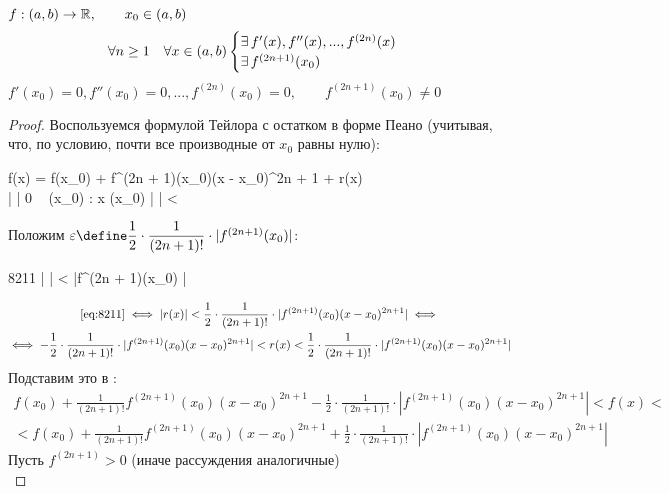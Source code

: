 \begin{theorem}
	\hfill \\
	$ f : (a, b) \to \mathbb{R}, \qquad x_0 \in (a, b) $
	$$ \forall n \ge 1 \quad \forall x \in (a, b)
	\begin{cases}
		\exists\, f'(x), f''(x), ..., f^{(2n)}(x) \\
		\exists\, f^{(2n + 1)}(x_0)
	\end{cases} $$
	$ f'(x_0) = 0, f''(x_0) = 0, ..., f^{(2n)}(x_0) = 0, \qquad f^{(2n + 1)}(x_0) \ne 0 $
\end{theorem}

\begin{proof}
	Воспользуемся формулой Тейлора с остатком в форме Пеано (учитывая, что, по условию, почти все производные от $x_0$ равны нулю):
	\begin{mequ}
		 f(x) = f(x_0) + f^{(2n + 1)}(x_0)(x - x_0)^{2n + 1} + r(x) \\
		 \bigg|  \bigg|  0 \iff \forall \veps ~ \exist \omega(x_0) : \forall x \in \omega(x_0) \bigg|  \bigg| < \veps
	\end{mequ}
	Положим $ \veps \define \dfrac12 \cdot \dfrac1{(2n + 1)!} \cdot |f^{(2n + 1)}(x_0) | $:
	\begin{equ}{8211}
		 \iff \bigg|  \bigg| <  \cdot {} \cdot |f^{(2n + 1)}(x_0) |
	\end{equ}
	\begin{multline*}
		\eref{8211} \iff |r(x)| < \frac12 \cdot \frac1{(2n + 1)!} \cdot | f^{(2n + 1)}(x_0)(x - x_0)^{2n + 1} | \iff \\ \iff -\frac12 \cdot \frac1{(2n + 1)!} \cdot | f^{(2n + 1)}(x_0)(x - x_0)^{2n + 1} | < r(x) < \frac12 \cdot \frac1{(2n + 1)!} \cdot | f^{(2n + 1)}(x_0)(x - x_0)^{2n + 1} |
	\end{multline*}
	Подставим это в :
	\begin{multline*}
		f(x_0) + \frac1{(2n + 1)!}f^{(2n + 1)}(x_0)(x - x_0)^{2n + 1} - \frac12 \cdot \frac1{(2n + 1)!} \cdot |f^{(2n + 1)}(x_0)(x - x_0)^{2n + 1} | < f(x) < \\ < f(x_0) + \frac1{(2n + 1)!}f^{(2n + 1)}(x_0)(x - x_0)^{2n + 1} + \frac12 \cdot \frac1{(2n + 1)!} \cdot |f^{(2n + 1)}(x_0)(x - x_0)^{2n + 1} |
	\end{multline*}
	Пусть $f^{(2n + 1)} > 0$ (иначе рассуждения аналогичные) \\

\end{proof}
